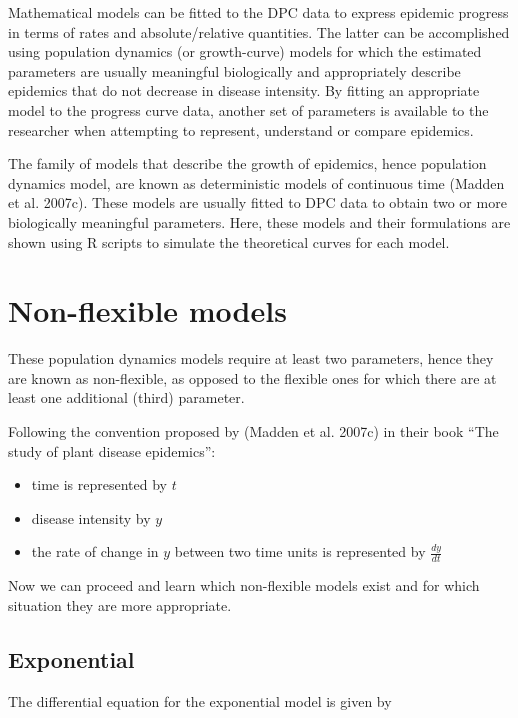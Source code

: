 \documentclass[
  letterpaper,
]{book}
\begin{document}
Mathematical models can be fitted to the DPC data to express epidemic
progress in terms of rates and absolute/relative quantities. The latter
can be accomplished using population dynamics (or growth-curve) models
for which the estimated parameters are usually meaningful biologically
and appropriately describe epidemics that do not decrease in disease
intensity. By fitting an appropriate model to the progress curve data,
another set of parameters is available to the researcher when attempting
to represent, understand or compare epidemics.

The family of models that describe the growth of epidemics, hence
population dynamics model, are known as deterministic models of
continuous time (Madden et al. 2007c). These models are usually fitted
to DPC data to obtain two or more biologically meaningful parameters.
Here, these models and their formulations are shown using R scripts to
simulate the theoretical curves for each model.

\hypertarget{non-flexible-models}{%
\section{Non-flexible models}\label{non-flexible-models}}

These population dynamics models require at least two parameters, hence
they are known as non-flexible, as opposed to the flexible ones for
which there are at least one additional (third) parameter.

Following the convention proposed by (Madden et al. 2007c) in their book
``The study of plant disease epidemics'':

\begin{itemize}
\item
  time is represented by \(t\)
\item
  disease intensity by \(y\)
\item
  the rate of change in \(y\) between two time units is represented by
  \(\frac{dy}{dt}\)
\end{itemize}

Now we can proceed and learn which non-flexible models exist and for
which situation they are more appropriate.

\hypertarget{exponential}{%
\subsection{Exponential}\label{exponential}}

The differential equation for the exponential model is given by
\end{document}

